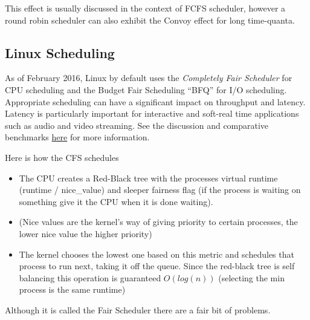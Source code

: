 This effect is usually discussed in the context of FCFS scheduler, however a round robin scheduler can also exhibit the Convoy effect for long time-quanta.

\begin{aside}

\subsection{Linux Scheduling}

As of February 2016, Linux by default uses the \emph{Completely Fair Scheduler} for CPU scheduling and the Budget Fair Scheduling ``BFQ'' for I/O scheduling. Appropriate scheduling can have a significant impact on throughput and latency. Latency is particularly important for interactive and soft-real time applications such as audio and video streaming. See the discussion and comparative benchmarks \href{https://lkml.org/lkml/2014/5/27/314}{here} for more information.

Here is how the CFS schedules

\begin{itemize}
\tightlist
\item
  The CPU creates a Red-Black tree with the processes virtual runtime (runtime / nice\_value) and sleeper fairness flag (if the process is waiting on something give it the CPU when it is done waiting).
\item
  (Nice values are the kernel's way of giving priority to certain processes, the lower nice value the higher priority)
\item
  The kernel chooses the lowest one based on this metric and schedules that process to run next, taking it off the queue. Since the red-black tree is self balancing this operation is guaranteed \(O(log(n))\) (selecting the min process is the same runtime)
\end{itemize}

Although it is called the Fair Scheduler there are a fair bit of problems.


\end{aside}
